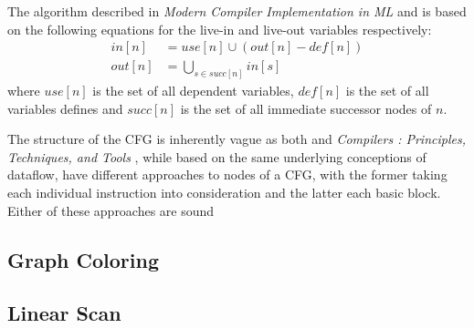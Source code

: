 \documentclass{article}
\begin{document}
The algorithm described in \textit{Modern Compiler Implementation in ML} \cite{tiger} and \cite{dragon} is based on the following equations for the live-in and live-out variables respectively:
\begin{align}
  in\left[n\right] &= use\left[n\right] \cup (out\left[n\right] - \mathit{def}\left[n\right])\\
  out\left[n\right] &= \bigcup_{s\in \mathit{succ}\left[n\right]} in\left[s\right]
\end{align}
where \(use\left[n\right]\) is the set of all dependent variables, \(def\left[n\right]\) is the set of all variables defines and \(succ\left[n\right]\) is the set of all immediate successor nodes of \(n\).

The structure of the CFG is inherently vague as both   \cite{tiger} and \textit{Compilers : Principles, Techniques, and Tools} \cite{dragon}, while based on the same underlying %
conceptions of dataflow, have different approaches to nodes of a CFG, with the former taking each individual instruction into consideration and the latter each basic block. Either of these approaches are sound 



\subsection{Graph Coloring}

\subsection{Linear Scan}







%
%
%
%
%
%
\end{document}
